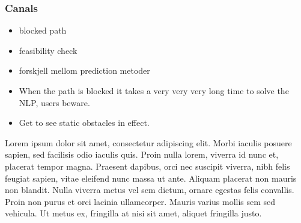 \subsubsection{Canals}
\begin{itemize}
    \item blocked path
    \item feasibility check
    \item forskjell mellom prediction metoder
    \item When the path is blocked it takes a very very very long time to solve the NLP, users beware.
    \item Get to see static obstacles in effect.
\end{itemize}
Lorem ipsum dolor sit amet, consectetur adipiscing elit. Morbi iaculis posuere sapien, sed facilisis odio iaculis quis. 
Proin nulla lorem, viverra id nunc et, placerat tempor magna. Praesent dapibus, orci nec suscipit viverra, nibh felis feugiat sapien, 
vitae eleifend nunc massa ut ante. Aliquam placerat non mauris non blandit. Nulla viverra metus vel sem dictum, ornare egestas felis convallis. 
Proin non purus et orci lacinia ullamcorper. Mauris varius mollis sem sed vehicula. Ut metus ex, fringilla at nisi sit amet, aliquet fringilla justo.



